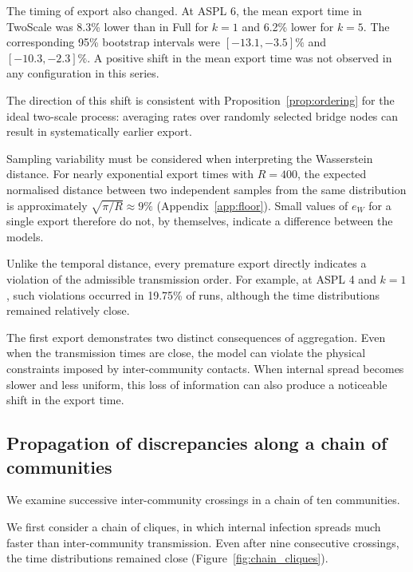 \documentclass{ieeeaccess}
\newcommand{\Full}{\textup{Full}}
\newcommand{\TS}{\textup{TwoScale}}
\newcommand{\eW}{e_{W}}
\begin{document}
The timing of export also changed. At ASPL 6, the mean export time in \TS{} was 8.3\% lower than in \Full{} for $k=1$ and 6.2\% lower for $k=5$. The corresponding 95\% bootstrap intervals were $[-13.1,-3.5]\%$ and $[-10.3,-2.3]\%$. A positive shift in the mean export time was not observed in any configuration in this series.

The direction of this shift is consistent with Proposition~\ref{prop:ordering} for the ideal two-scale process: averaging rates over randomly selected bridge nodes can result in systematically earlier export.

Sampling variability must be considered when interpreting the Wasserstein distance. For nearly exponential export times with $R=400$, the expected normalised distance between two independent samples from the same distribution is approximately $\sqrt{\pi/R}\approx9\%$ (Appendix~\ref*{app:floor}). Small values of $\eW$ for a single export therefore do not, by themselves, indicate a difference between the models.

Unlike the temporal distance, every premature export directly indicates a violation of the admissible transmission order. For example, at ASPL 4 and $k=1$, such violations occurred in 19.75\% of runs, although the time distributions remained relatively close.

The first export demonstrates two distinct consequences of aggregation. Even when the transmission times are close, the model can violate the physical constraints imposed by inter-community contacts. When internal spread becomes slower and less uniform, this loss of information can also produce a noticeable shift in the export time.

\subsection{Propagation of discrepancies along a chain of communities}
\label{sec:res_chain_random}

We examine successive inter-community crossings in a chain of ten communities.

We first consider a chain of cliques, in which internal infection spreads much faster than inter-community transmission. Even after nine consecutive crossings, the time distributions remained close (Figure~\ref{fig:chain_cliques}).
\end{document}

